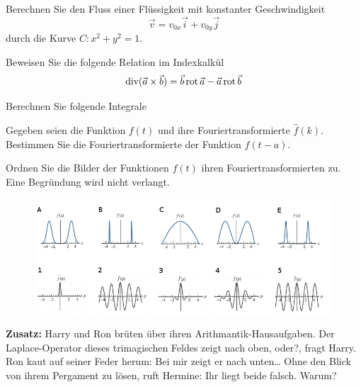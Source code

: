 \documentclass{atistandalonetask}
\begin{document}
\begin{atiTask}[
	title = Weitere Fragen
]
	\providecommand{\D}{\mathrm{d}}

\begin{atiSubtasks}
	\item Berechnen Sie den Fluss einer Flüssigkeit mit konstanter Geschwindigkeit 
	\[
	\vec{v}=v_{0x}\vec{i}+v_{0y}\vec{j}
	\]
	durch die Kurve $C: x^2+y^2=1$. %
	\item Beweisen Sie die folgende Relation im Indexkalkül
	\[\operatorname{div}(\vec{a}\times\vec{b})=\vec{b}\operatorname{rot} \vec{a}-\vec{a}\operatorname{rot}\vec{b}
	\]
	\item Berechnen Sie folgende Integrale
	\begin{multicols}{2}
	\begin{atiSubequations}
		\item{}
		\item{}
	    \item{}
	    \item{}
	\end{atiSubequations}
	\end{multicols}
	\item Gegeben seien die Funktion $f(t)$ und ihre Fouriertransformierte $\hat{f}(k)$. Bestimmen Sie die Fouriertransformierte der Funktion $f(t-a)$.
	\item Ordnen Sie die Bilder der Funktionen $f(t)$ ihren Fouriertransformierten zu. Eine Begründung wird nicht verlangt.
	\begin{figure}[H]
	\centering
	\includegraphics[width=1\linewidth]{./picture-klausurss18b}
	\end{figure}
	\item \textbf{Zusatz:} Harry und Ron brüten über ihren Arithmantik-Hausaufgaben. \glqq Der Laplace-Operator dieses trimagischen 
	Feldes zeigt nach oben, oder?\grqq{}, fragt Harry. Ron kaut auf seiner Feder herum: \glqq Bei mir zeigt er nach unten\dots\grqq{} Ohne den Blick von ihrem Pergament zu lösen, ruft Hermine: \glqq Ihr liegt beide falsch.\grqq{} Warum?
\end{atiSubtasks}

\end{atiTask}
\end{document}
